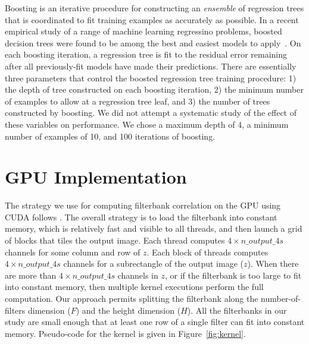 \documentclass{sig-alternate}
\begin{document}
Boosting is an iterative procedure for constructing an {\em ensemble} of regression trees that is coordinated to fit training examples as accurately as possible.
In a recent empirical study of a range of machine learning regressino problems,
boosted decision trees were found to be among the best and easiest models to apply~\cite{caruana:2010}.
On each boosting iteration, a regression tree is fit to the residual error remaining
after all previously-fit models have made their predictions.
There are essentially three parameters that control the boosted regression tree
training procedure:
1) the depth of tree constructed on each boosting iteration,
2) the minimum number of examples to allow at a regression tree leaf, and
3) the number of trees constructed by boosting.
We did not attempt a systematic study of the effect of these variables on performance.
We chose a maximum depth of 4,
a minimum number of examples of 10,
and 100 iterations of boosting.


\section{GPU Implementation}
\label{sec:kernel}

The strategy we use for computing filterbank correlation on the GPU
using CUDA follows \citet{pinto+cox:2011gcg}.
The overall strategy is to load the filterbank into constant memory, which is
relatively fast and visible to all threads, and then launch a grid of blocks
that tiles the output image.
Each thread computes $4 \times n\_output\_4s$ channels for some column and row of $z$.
Each block of threads computes $4 \times n\_output\_4s$ channels for a subrectangle of the output image ($z$).
When there are more than $4 \times n\_output\_4s$ channels in $z$, or if the
filterbank is too large to fit into constant memory, then multiple
kernel executions perform the full computation.
Our approach permits splitting the filterbank along
the number-of-filters dimension ($F$) and the height dimension ($H$).
All the filterbanks in our study are small enough that
at least one row of a single filter can fit into constant memory.
Pseudo-code for the kernel is given in Figure~\ref{fig:kernel}.
\end{document}
